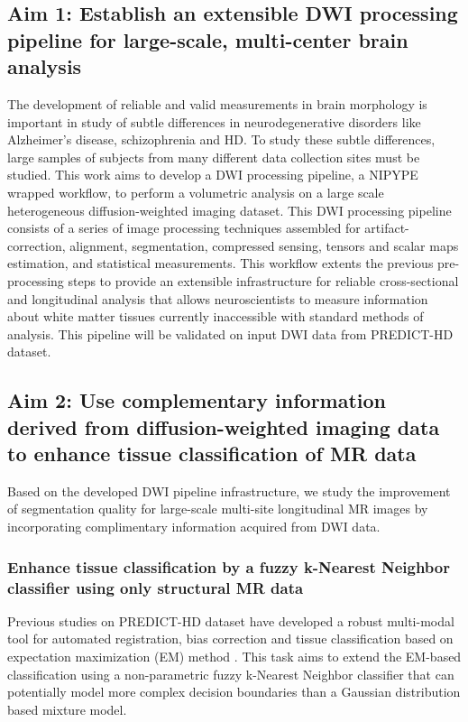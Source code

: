 \subsection{Aim 1: Establish an extensible DWI processing pipeline for large-scale, multi-center brain analysis}
The development of reliable and valid measurements in brain morphology is important in study of subtle differences in neurodegenerative disorders like Alzheimer's disease, schizophrenia and HD. To study these subtle differences, large samples of subjects from many different data collection sites must be studied. This work aims to develop a DWI processing pipeline, a NIPYPE wrapped workflow, to perform a volumetric analysis on a large scale heterogeneous diffusion-weighted imaging dataset. This DWI processing pipeline consists of a series of image processing techniques assembled for artifact-correction, alignment, segmentation, compressed sensing, tensors and scalar maps estimation, and statistical measurements. This workflow extents the previous pre-processing steps \cite{Matsui2014} to provide an extensible infrastructure for reliable cross-sectional and longitudinal analysis that allows neuroscientists to measure information about white matter tissues currently inaccessible with standard methods of analysis. This pipeline will be validated on input DWI data from PREDICT-HD dataset.
\newline

\subsection{Aim 2: Use complementary information derived from diffusion-weighted imaging data to enhance tissue classification of MR data}
Based on the developed DWI pipeline infrastructure, we study the improvement of segmentation quality for large-scale multi-site longitudinal MR images by incorporating complimentary information acquired from DWI data.

\subsubsection{Enhance tissue classification by a fuzzy k-Nearest Neighbor classifier using only structural MR data}
\label{MROnlyKNN}
Previous studies on PREDICT-HD dataset have developed a robust multi-modal tool for automated registration, bias correction and tissue classification based on expectation maximization (EM) method \cite{Kim2013}. This task aims to extend the EM-based classification using a non-parametric fuzzy k-Nearest Neighbor classifier that can potentially model more complex decision boundaries than a Gaussian distribution based mixture model.
\newline

